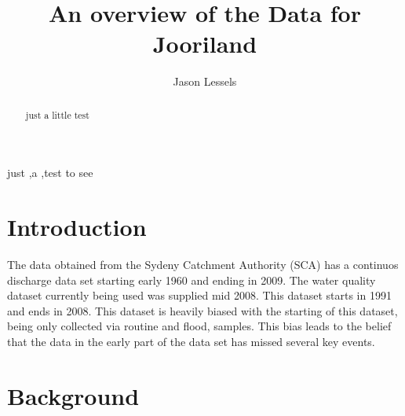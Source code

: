 \documentclass[5p]{elsarticle}
\begin{document}
\begin{frontmatter}
\title{An overview of the Data for Jooriland}
\author[jsl]{Jason Lessels}
\address[jsl]{The University of Sydney}
\begin{abstract}
just a little test
\end{abstract}
\begin{keyword}
just \sep a \sep test to see
\end{keyword}

\end{frontmatter}
\section{Introduction}
The data obtained from the Sydeny Catchment Authority (SCA) has a continuos discharge data set starting early 1960 and ending in 2009. The water quality dataset currently being used was supplied mid 2008. This dataset starts in 1991 and ends in 2008. This dataset is heavily biased with the starting of this dataset, being only collected via routine and flood, samples. This bias leads to the belief that the data in the early part of the data set has missed several key events.
\section{Background}
\end{document}
